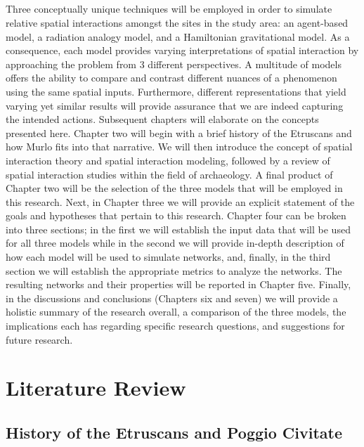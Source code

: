 \documentclass[12pt,a4paper]{thesis}
\begin{document}
\paragraph{}
Three conceptually unique techniques will be employed in order to simulate relative spatial interactions amongst the sites in the study area: an agent-based model, a radiation analogy model, and a Hamiltonian gravitational model. As a consequence, each model provides varying interpretations of spatial interaction by approaching the problem from 3 different perspectives. A multitude of models offers the ability to compare and contrast different nuances of a phenomenon using the same spatial inputs. Furthermore, different representations that yield varying yet similar results will provide assurance that we are indeed capturing the intended actions. Subsequent chapters will elaborate on the concepts presented here. Chapter two will begin with a brief history of the Etruscans  and how Murlo fits into that narrative. We will then introduce the concept of spatial interaction theory and spatial interaction modeling, followed by a review of spatial interaction studies within the field of archaeology. A final product of Chapter two will be the selection of the three models that will be employed in this research.  Next, in Chapter three we will provide an explicit statement of the goals and hypotheses that pertain to this research. Chapter four can be broken into three sections;  in the first we will establish the input data that will be used for all three models while in the second we will provide in-depth description of how each model will be used to simulate networks, and, finally, in the third section we will establish the appropriate metrics to analyze the networks. The resulting networks and their properties will be reported in Chapter five. Finally, in the discussions and conclusions (Chapters six and seven) we will provide a holistic summary of the research overall, a comparison of the three models, the implications each has regarding specific research questions, and suggestions for future research.

\chapter{Literature Review}
\section{History of the Etruscans and Poggio Civitate}
\end{document}
